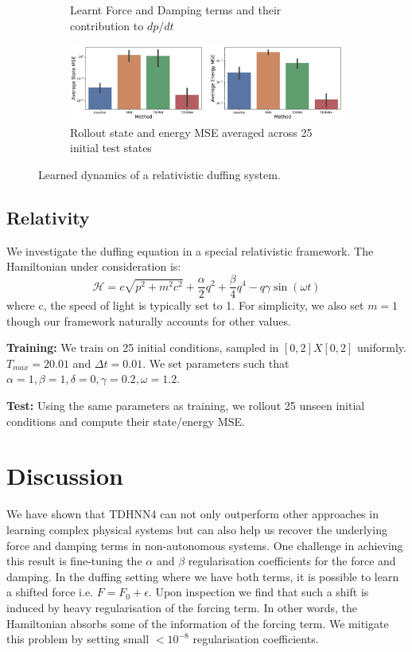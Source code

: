 \documentclass[twoside]{article}
\begin{document}
\begin{figure}[h!]
\begin{subfigure}[b]{0.48\textwidth}
		\caption{Learnt Force and Damping terms and their contribution to $dp/dt$}
	\end{subfigure}
	\begin{subfigure}[b]{0.48\textwidth}
	    \centering
		\includegraphics[width=\textwidth]{figures/relativity_errors.pdf}
		\caption{Rollout state and energy MSE averaged across 25 initial test states}
	\end{subfigure}
\caption{Learned dynamics of a relativistic duffing system.}
\end{figure}
\subsection{Relativity}
We investigate the duffing equation in a special relativistic framework. The Hamiltonian under consideration is:
\begin{equation}
\mathcal{H} =  c\sqrt{p^2 +m^2c^2} + \frac{\alpha}{2}q^2 +\frac{\beta}{4}q^4 - q\gamma\sin(\omega t)
\end{equation}
where c, the speed of light is typically set to 1. For simplicity, we also set $m=1$ though our framework naturally accounts for other values.

\textbf{Training:} We train on 25 initial conditions, sampled in $[0,2]X[0,2]$ uniformly. $T_{max} = 20.01$ and $\Delta t = 0.01$. We set parameters such that $\alpha =1, \beta =1,\delta =0,\gamma = 0.2,\omega = 1.2$.

\textbf{Test:} Using the same parameters as training, we rollout 25 unseen initial conditions and compute their state/energy MSE.

\section{Discussion}

We have shown that TDHNN4 can not only outperform other approaches in learning complex physical systems but can also help us recover the underlying force and damping terms in non-autonomous systems. One challenge in achieving this result is fine-tuning the $\alpha$ and $\beta$ regularisation coefficients for the force and damping. In the duffing setting where we have both terms, it is possible to learn a shifted force i.e. $F = F_0 + \epsilon$. Upon inspection we find that such a shift is induced by heavy regularisation of the forcing term. In other words, the Hamiltonian absorbs some of the information of the forcing term. We mitigate this problem by setting small $< 10^{-8}$ regularisation coefficients.
\end{document}
